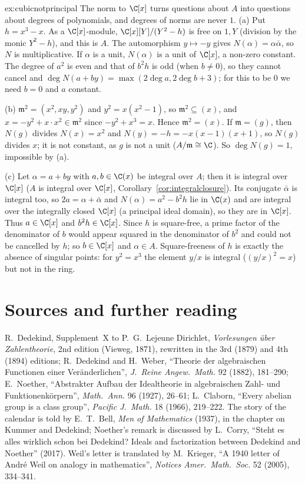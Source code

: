 \begin{solution}{ex:cubicnotprincipal}
\idea The norm to $\C[x]$ turns questions about $A$ into questions about degrees of polynomials, and degrees of norms are never $1$.
\writeup (a) Put $h=x^3-x$. As a $\C[x]$-module, $\C[x][Y]/(Y^2-h)$ is free on $1,Y$ (division by the monic $Y^2-h$), and this is $A$. The automorphism $y\mapsto-y$ gives $N(\alpha)=\alpha\bar\alpha$, so $N$ is multiplicative.
If $\alpha$ is a unit, $N(\alpha)$ is a unit of $\C[x]$, a non-zero constant. The degree of $a^2$ is even and that of $b^2h$ is odd (when $b\ne0$), so they cannot cancel and $\deg N(a+by)=\max(2\deg a,2\deg b+3)$; for this to be
$0$ we need $b=0$ and $a$ constant.

(b) $\mathfrak m^2=(x^2,xy,y^2)$ and $y^2=x(x^2-1)$, so $\mathfrak m^2\subseteq(x)$, and $x=-y^2+x\cdot x^2\in\mathfrak m^2$ since $-y^2+x^3=x$. Hence $\mathfrak m^2=(x)$. If $\mathfrak m=(g)$, then $N(g)$ divides
$N(x)=x^2$ and $N(y)=-h=-x(x-1)(x+1)$, so $N(g)$ divides $x$; it is not constant, as $g$ is not a unit ($A/\mathfrak m\cong\C$). So $\deg N(g)=1$, impossible by (a).

(c) Let $\alpha=a+by$ with $a,b\in\C(x)$ be integral over $A$; then it is integral over $\C[x]$ ($A$ is integral over $\C[x]$, Corollary~\ref{cor:integralclosure}). Its conjugate $\bar\alpha$ is integral too, so $2a=\alpha+\bar\alpha$ and
$N(\alpha)=a^2-b^2h$ lie in $\C(x)$ and are integral over the integrally closed $\C[x]$ (a principal ideal domain), so they are in $\C[x]$. Thus $a\in\C[x]$ and $b^2h\in\C[x]$. Since $h$ is square-free, a prime factor of
the denominator of $b$ would appear squared in the denominator of $b^2$ and could not be cancelled by $h$; so $b\in\C[x]$ and $\alpha\in A$. Square-freeness of $h$ is exactly the absence of singular points: for $y^2=x^3$ the
element $y/x$ is integral ($(y/x)^2=x$) but not in the ring.
\end{solution}

\section*{Sources and further reading}

R.~Dedekind, Supplement~X to P.~G.~Lejeune Dirichlet, \emph{Vorlesungen über Zahlentheorie}, 2nd edition (Vieweg, 1871), rewritten in the 3rd (1879) and 4th (1894) editions; R.~Dedekind and H.~Weber, ``Theorie der algebraischen
Functionen einer Veränderlichen'', \emph{J.\ Reine Angew.\ Math.} 92 (1882), 181--290; E.~Noether, ``Abstrakter Aufbau der Idealtheorie in algebraischen Zahl- und Funktionenkörpern'', \emph{Math.\ Ann.} 96 (1927), 26--61;
L.~Claborn, ``Every abelian group is a class group'', \emph{Pacific J.\ Math.} 18 (1966), 219--222. The story of the calendar is told by E.~T.~Bell, \emph{Men of Mathematics} (1937), in the chapter on Kummer and Dedekind;
Noether's remark is discussed by L.~Corry, ``Steht es alles wirklich schon bei Dedekind? Ideals and factorization between Dedekind and Noether'' (2017). Weil's letter is translated by M.~Krieger, ``A 1940 letter of André Weil on
analogy in mathematics'', \emph{Notices Amer.\ Math.\ Soc.} 52 (2005), 334--341.


